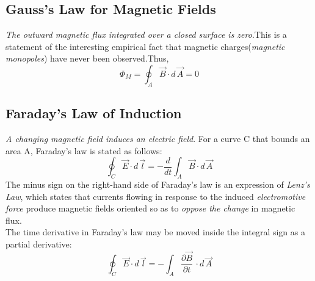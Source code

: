 \documentclass[12pt]{article}
\numberwithin{equation}{section}
\begin{document}
\subsection{Gauss's Law for Magnetic Fields}
\emph{The outward magnetic flux integrated over a closed surface is zero}.This is a statement of the interesting empirical fact that magnetic charges(\emph{magnetic monopoles}) have never been observed.Thus,
\begin{equation}
    \Phi_{M}=\oint_A \vec{B} \cdot d\,\vec{A}=0\label{14}
\end{equation}
\subsection{Faraday's Law of Induction}
\emph{A changing magnetic field induces an electric field}. For a curve C that bounds an area A, Faraday's law is stated as follows:
\begin{equation}
    \oint_C \vec{E}\cdot d\,\vec{l}=-\frac{d}{dt}\int_A \vec{B}\cdot d\,\vec{A}\label{15}
\end{equation}
The minus sign on the right-hand side of Faraday's law is an expression of \emph{Lenz's Law},
which states that currents flowing in response to the induced \emph{electromotive force} produce magnetic fields
oriented so as to \emph{oppose the change} in magnetic flux.\\
The time derivative in Faraday's law may be moved inside the integral sign as a partial derivative:
\begin{equation}
    \oint_C \vec{E}\cdot d\,\vec{l}=-\int_A \frac{\partial{\vec{B}}}{\partial{t}}\,\cdot d\,\vec{A}\label{16}
\end{equation}
\end{document}

